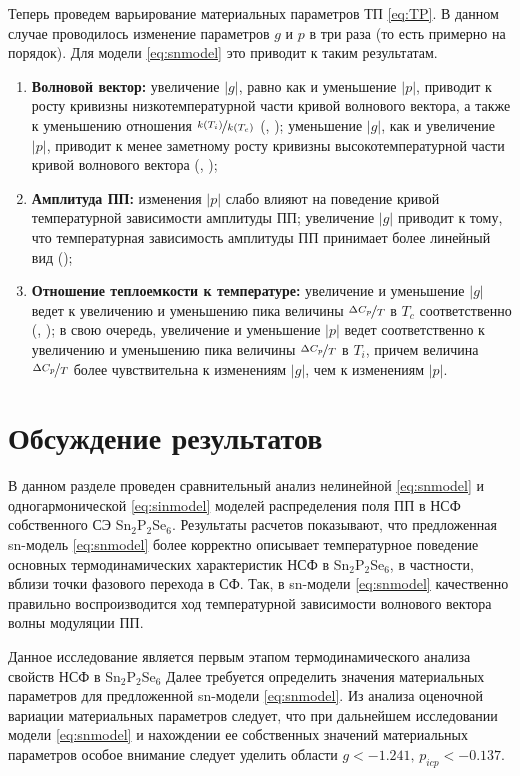 Теперь проведем варьирование материальных параметров ТП \eqref{eq:TP}. В данном случае проводилось изменение параметров $g$ и $p$ в три раза (то есть примерно на порядок). Для модели \eqref{eq:snmodel} это приводит к таким результатам.
\begin{enumerate}
\item
\textbf{Волновой вектор:} увеличение $|g|$, равно как и уменьшение $|p|$, приводит к росту кривизны низкотемпературной части кривой волнового вектора, а также к уменьшению отношения $\nicefrac{k(T_i)}{k(T_c)}$ (, ); уменьшение $|g|$, как и увеличение $|p|$, приводит к менее заметному росту кривизны высокотемпературной части кривой волнового вектора (, );
\item
\textbf{Амплитуда ПП:} изменения $|p|$ слабо влияют на поведение кривой температурной зависимости амплитуды ПП; увеличение $|g|$ приводит к тому, что температурная зависимость амплитуды ПП принимает более линейный вид ();
\item
\textbf{Отношение теплоемкости к температуре:} увеличение и уменьшение $|g|$ ведет к увеличению и уменьшению пика величины $\nicefrac{\Delta C_p}{T}$ в $T_c$ соответственно (, ); в свою очередь, увеличение и уменьшение $|p|$ ведет соответственно к увеличению и уменьшению пика величины $\nicefrac{\Delta C_p}{T}$ в $T_i$, причем величина $\nicefrac{\Delta C_p}{T}$ более чувствительна к изменениям $|g|$, чем к изменениям $|p|$.
\end{enumerate}



\section{Обсуждение результатов}\label{sec:discuss}

В данном разделе проведен сравнительный анализ нелинейной \eqref{eq:snmodel} и одногармонической \eqref{eq:sinmodel} моделей распределения поля ПП в НСФ собственного СЭ Sn$_2$P$_2$Se$_6$. Результаты расчетов показывают, что предложенная sn-модель \eqref{eq:snmodel} более корректно описывает температурное поведение основных термодинамических характеристик НСФ в Sn$_2$P$_2$Se$_6$, в частности, вблизи точки фазового перехода в СФ. Так, в sn-модели \eqref{eq:snmodel} качественно правильно воспроизводится ход температурной зависимости волнового вектора волны модуляции ПП.

Данное исследование является первым этапом термодинамического анализа свойств НСФ в Sn$_2$P$_2$Se$_6$ Далее требуется определить значения материальных параметров для предложенной sn-модели \eqref{eq:snmodel}. Из анализа оценочной вариации материальных параметров следует, что при дальнейшем исследовании модели \eqref{eq:snmodel} и нахождении ее собственных значений материальных параметров особое внимание следует уделить области $g < -1.241,\, p_{icp} < -0.137$.
